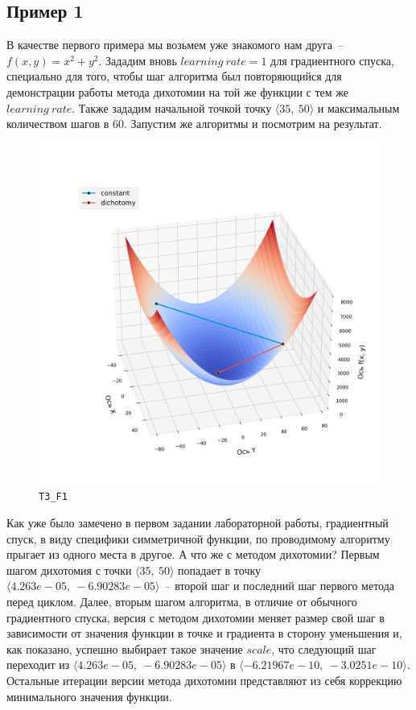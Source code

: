\documentclass[12pt, a4paper, oneside, final]{article}
\begin{document}
	\subsection*{Пример 1}
	В качестве первого примера мы возьмем уже знакомого нам друга~-- $f(x, y) = x^{2} + y^{2}$. Зададим вновь $learning~rate = 1$ для градиентного спуска, специально для того, чтобы шаг алгоритма был повторяющийся для демонстрации работы метода дихотомии на той же функции с тем же $learning~rate$. Также зададим начальной точкой точку $\langle 35, ~ 50 \rangle$ и максимальным количеством шагов в $60$. Запустим же алгоритмы и посмотрим на результат.
	\begin{figure}[H]
		\centering
		\includegraphics[scale=0.68]{Image/T3_F1.png}
		\caption*{\texttt{T3\_F1}}
	\end{figure}
	Как уже было замечено в первом задании лабораторной работы, градиентный спуск, в виду специфики симметричной функции, по проводимому алгоритму прыгает из одного места в другое. А что же с методом дихотомии? Первым шагом дихотомия с точки $\langle 35, ~ 50\rangle$ попадает в точку $\langle 4.263e-05, ~  -6.90283e-05\rangle$~-- второй шаг и последний шаг первого метода перед циклом. Далее, вторым шагом алгоритма, в отличие от обычного градиентного спуска, версия с методом дихотомии меняет размер свой шаг в зависимости от значения функции в точке и градиента в сторону уменьшения и, как показано, успешно выбирает такое значение $scale$, что следующий шаг переходит из $\langle 4.263e-05, ~  -6.90283e-05\rangle$ в $\langle -6.21967e-10, ~ -3.0251e-10\rangle$. Остальные итерации версии метода дихотомии представляют из себя коррекцию минимального значения функции.
\end{document}
